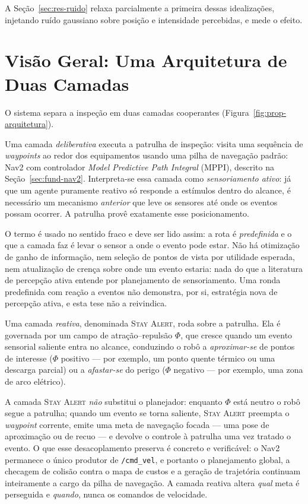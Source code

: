 A Seção~\ref{sec:res-ruido} relaxa parcialmente a primeira dessas idealizações,
injetando ruído gaussiano sobre posição e intensidade percebidas, e mede o efeito.

\section{Visão Geral: Uma Arquitetura de Duas Camadas}
\label{sec:prop-visao}

O sistema separa a inspeção em duas camadas cooperantes
(Figura~\ref{fig:prop-arquitetura}).

Uma camada \emph{deliberativa} executa a patrulha de inspeção: visita uma sequência
de \textit{waypoints} ao redor dos equipamentos usando uma pilha de navegação padrão: Nav2 com controlador \textit{Model Predictive Path Integral} (MPPI), descrito na Seção~\ref{sec:fund-nav2}. Interpreta-se
essa camada como \emph{sensoriamento ativo}: já que um agente puramente reativo só
responde a estímulos dentro do alcance, é necessário um mecanismo \emph{anterior} que
leve os sensores até onde os eventos possam ocorrer. A patrulha provê exatamente esse
posicionamento.

O termo é usado no sentido fraco e deve ser lido assim: a rota é \emph{predefinida} e
o que a camada faz é levar o sensor a onde o evento pode estar. Não há otimização de
ganho de informação, nem seleção de pontos de vista por utilidade esperada, nem
atualização de crença sobre onde um evento estaria: nada do que a literatura de
percepção ativa entende por planejamento de sensoriamento. Uma ronda predefinida com
reação a eventos não demonstra, por si, estratégia nova de percepção ativa, e esta
tese não a reivindica.

Uma camada \emph{reativa}, denominada \textsc{Stay Alert}, roda sobre a patrulha. Ela
é governada por um campo de atração--repulsão $\Phi$, que cresce quando um evento
sensorial saliente entra no alcance, conduzindo o robô a \emph{aproximar-se} de
pontos de interesse ($\Phi$ positivo --- por exemplo, um ponto quente térmico ou uma
descarga parcial) ou a \emph{afastar-se} do perigo ($\Phi$ negativo --- por exemplo,
uma zona de arco elétrico).

A camada \textsc{Stay Alert} \emph{não} substitui o planejador: enquanto $\Phi$ está
neutro o robô segue a patrulha; quando um evento se torna saliente, \textsc{Stay
Alert} preempta o \textit{waypoint} corrente, emite uma meta de navegação focada ---
uma pose de aproximação ou de recuo --- e devolve o controle à patrulha uma vez
tratado o evento. O que esse desacoplamento preserva é concreto e verificável: o
Nav2 permanece o único produtor de \texttt{/cmd\_vel}, e portanto o planejamento
global, a checagem de colisão contra o mapa de custos e a geração de trajetória
continuam inteiramente a cargo da pilha de navegação. A camada reativa altera
\emph{qual} meta é perseguida e \emph{quando}, nunca os comandos de velocidade.

